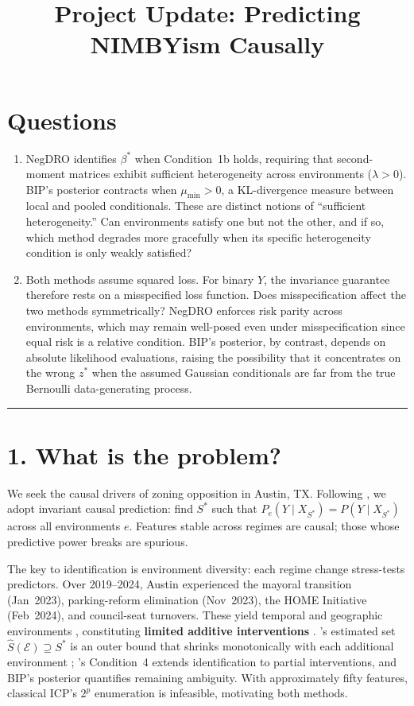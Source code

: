 \documentclass[11pt]{article}
\begin{document}
\section*{Questions}
\begin{enumerate}
    \item NegDRO identifies $\beta^*$ when Condition~1b holds, requiring that second-moment matrices exhibit sufficient heterogeneity across environments ($\lambda>0$). BIP's posterior contracts when $\mu_{\min}>0$, a KL-divergence measure between local and pooled conditionals. These are distinct notions of ``sufficient heterogeneity.'' Can environments satisfy one but not the other, and if so, which method degrades more gracefully when its specific heterogeneity condition is only weakly satisfied?
    \item Both methods assume squared loss. For binary $Y$, the invariance guarantee therefore rests on a misspecified loss function. Does misspecification affect the two methods symmetrically? NegDRO enforces risk parity across environments, which may remain well-posed even under misspecification since equal risk is a relative condition. BIP's posterior, by contrast, depends on absolute likelihood evaluations, raising the possibility that it concentrates on the wrong $z^*$ when the assumed Gaussian conditionals are far from the true Bernoulli data-generating process.
\end{enumerate}

\newpage
\title{\vspace{-2em}\textbf{Project Update: Predicting NIMBYism Causally}}
\vspace{0.5em}
\hrule
\vspace{0.5em}

\section*{1. What is the problem?}
We seek the causal drivers of zoning opposition in Austin, TX. Following \citet{peters2016icp}, we adopt invariant causal prediction: find $S^*$ such that $P_e(Y \mid X_{S^*}) = P(Y \mid X_{S^*})$ across all environments $e$. Features stable across regimes are causal; those whose predictive power breaks are spurious.

The key to identification is environment diversity: each regime change stress-tests predictors. Over 2019--2024, Austin experienced the mayoral transition (Jan~2023), parking-reform elimination (Nov~2023), the HOME Initiative (Feb~2024), and council-seat turnovers. These yield temporal and geographic environments \citep[assumption~B]{buhlmann2020invariance}, constituting \textbf{limited additive interventions} \citep{rothenhausler2019causal,fan2024negdro}. \citeauthor{peters2016icp}'s estimated set $\hat{S}(\mathcal{E}) \supseteq S^*$ is an outer bound that shrinks monotonically with each additional environment \citep[Thm~1]{peters2016icp}; \citeauthor{fan2024negdro}'s Condition~4 extends identification to partial interventions, and BIP's posterior quantifies remaining ambiguity. With approximately fifty features, classical ICP's $2^p$ enumeration is infeasible, motivating both methods.
\end{document}
